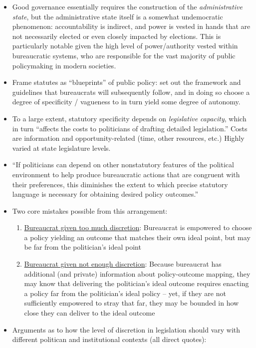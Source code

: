 \documentclass[12pt]{article}
\begin{document}
\begin{itemize}[leftmargin=*, itemsep=4pt]
\begin{enumerate}
    \end{enumerate}
    \item Good governance essentially requires the construction of the \emph{administrative state}, but the administrative state itself is a somewhat undemocratic phenomenon: accountability is indirect, and power is vested in hands that are not necessarily elected or even closely impacted by elections. This is particularly notable given the high level of power/authority vested within bureaucratic systems, who are responsible for the vast majority of public policymaking in modern societies.
    \item Frame statutes as ``blueprints'' of public policy: set out the framework and guidelines that bureaucrats will subsequently follow, and in doing so choose a degree of specificity / vagueness to in turn yield some degree of autonomy.
    \item To a large extent, statutory specificity depends on \emph{legislative capacity}, which in turn ``affects the costs to politicians of drafting detailed legislation.'' Costs are information and opportunity-related (time, other resources, etc.) Highly varied at state legislature levels.
    \item ``If politicians can depend on other nonstatutory features of the political environment to help produce bureaucratic actions that are congruent with their preferences, this diminishes the extent to which precise statutory language is necessary for obtaining desired policy outcomes.''
    \item Two core mistakes possible from this arrangement:
    \begin{enumerate}
        \item \underline{Bureaucrat given too much discretion}: Bureaucrat is empowered to choose a policy yielding an outcome that matches their own ideal point, but may be far from the politician's ideal point
        \item \underline{Bureaucrat given not enough discretion}: Because bureaucrat has additional (and private) information about policy-outcome mapping, they may know that delivering the politician's ideal outcome requires enacting a policy far from the politician's ideal policy -- yet, if they are not sufficiently empowered to stray that far, they may be bounded in how close they can deliver to the ideal outcome
    \end{enumerate}
    \item Arguments as to how the level of discretion in legislation should vary with different politican and institutional contexts (all direct quotes):

\end{itemize}
\end{document}
